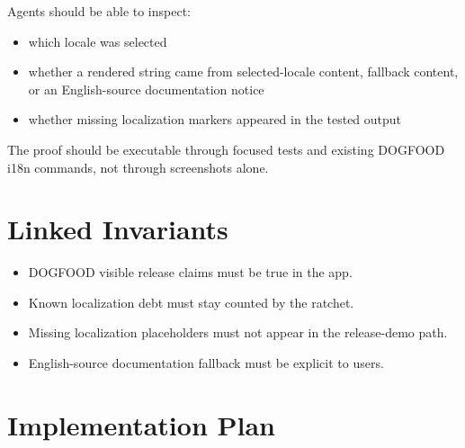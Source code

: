 Agents should be able to inspect:

\begin{itemize}
\tightlist
\item
  which locale was selected
\item
  whether a rendered string came from selected-locale content, fallback content, or an English-source documentation notice
\item
  whether missing localization markers appeared in the tested output
\end{itemize}

The proof should be executable through focused tests and existing DOGFOOD i18n commands, not through screenshots alone.

\section{Linked Invariants}\label{record-196-linked-invariants}

\begin{itemize}
\tightlist
\item
  DOGFOOD visible release claims must be true in the app.
\item
  Known localization debt must stay counted by the ratchet.
\item
  Missing localization placeholders must not appear in the release-demo path.
\item
  English-source documentation fallback must be explicit to users.
\end{itemize}

\section{Implementation Plan}\label{record-196-implementation-plan}

